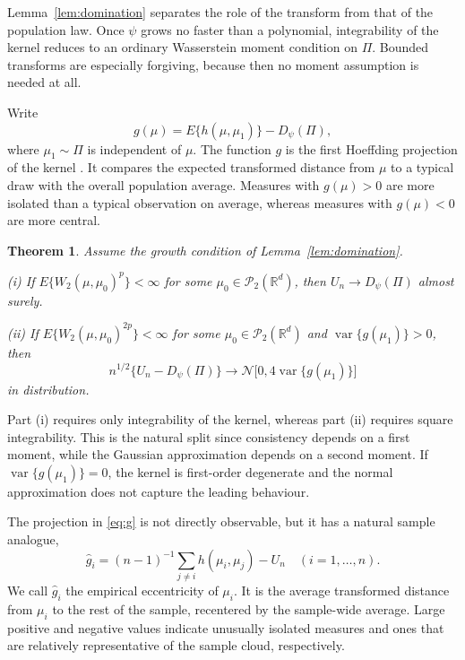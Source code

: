 \documentclass[10pt]{article}
\newtheorem{theorem}{Theorem}[section]
\DeclareMathOperator{\varop}{var}
\newcommand{\R}{\mathbb{R}}
\newcommand{\Ptwo}{\mathcal{P}_2(\R^d)}
\newcommand{\W}{W_2}
\begin{document}
Lemma~\ref{lem:domination} separates the role of the transform from that of the population law. Once $\psi$ grows no faster than a polynomial, integrability of the kernel reduces to an ordinary Wasserstein moment condition on $\Pi$. Bounded transforms are especially forgiving, because then no moment assumption is needed at all.

Write
\begin{equation}
g(\mu)=E\{h(\mu,\mu_1)\}-D_{\psi}(\Pi),
\label{eq:g}
\end{equation}
where $\mu_1\sim\Pi$ is independent of $\mu$. The function $g$ is the first Hoeffding projection of the kernel \citep{hoeffding_1948_ClassStatisticsAsymptotically}. It compares the expected transformed distance from $\mu$ to a typical draw with the overall population average. Measures with $g(\mu)>0$ are more isolated than a typical observation on average, whereas measures with $g(\mu)<0$ are more central.

\begin{theorem}\label{thm:main}
Assume the growth condition of Lemma~\ref{lem:domination}.

\noindent (i) If $E\{\W(\mu,\mu_0)^p\}<\infty$ for some $\mu_0\in\Ptwo$, then $U_n\to D_{\psi}(\Pi)$ almost surely.

\noindent (ii) If $E\{\W(\mu,\mu_0)^{2p}\}<\infty$ for some $\mu_0\in\Ptwo$ and $\varop\{g(\mu_1)\}>0$, then
\[
n^{1/2}\{U_n-D_{\psi}(\Pi)\}\to \mathcal{N}\bigl[0,4\varop\{g(\mu_1)\}\bigr]
\]
in distribution.
\end{theorem}

Part (i) requires only integrability of the kernel, whereas part (ii) requires square integrability. This is the natural split since consistency depends on a first moment, while the Gaussian approximation depends on a second moment. If $\varop\{g(\mu_1)\}=0$, the kernel is first-order degenerate and the normal approximation does not capture the leading behaviour.

The projection in \eqref{eq:g} is not directly observable, but it has a natural sample analogue,
\begin{equation}
\widehat g_i=(n-1)^{-1}\sum_{j\neq i} h(\mu_i,\mu_j)-U_n\quad (i=1,\ldots,n).
\label{eq:ghat}
\end{equation}
We call $\widehat g_i$ the empirical eccentricity of $\mu_i$. It is the average transformed distance from $\mu_i$ to the rest of the sample, recentered by the sample-wide average. Large positive and negative values indicate unusually isolated measures and ones that are relatively representative of the sample cloud, respectively.
\end{document}
